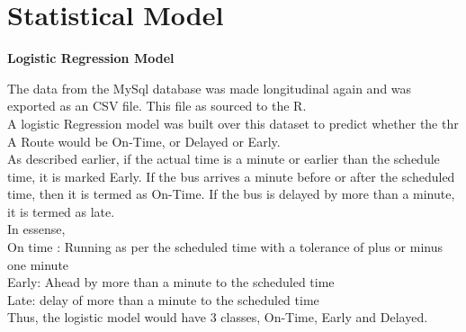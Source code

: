 \documentclass[12pt]{article}\usepackage[]{graphicx}\usepackage[]{color}
\begin{document}
\section{Statistical Model}
\textbf{Logistic Regression Model}

The data from the MySql database was made longitudinal again and was exported as an CSV file. This file as sourced to the R.\\

A logistic Regression model was built over this dataset to predict whether the thr A Route would be On-Time, or Delayed or Early.\\

As described earlier, if the actual time is a minute or earlier than the schedule time, it is marked Early. If the bus arrives a minute before or after the scheduled time, then it is termed as On-Time. If the bus is delayed by more than a minute, it is termed as late.\\

In essense,\\
On time : Running as per the scheduled time with a tolerance of plus or minus one minute\\
Early: Ahead by more than a minute to the scheduled time\\
Late: delay of more than a minute to the scheduled time\\

Thus, the logistic model would have 3 classes, On-Time, Early and Delayed.\\
\end{document}
